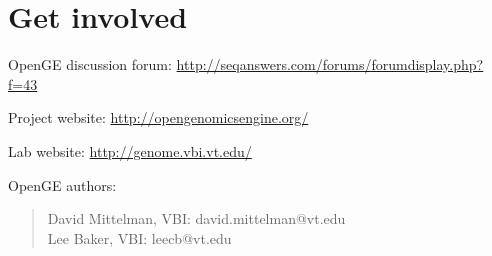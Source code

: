 \documentclass[11pt]{article}
\newcommand {\cmd}[1] {\begin{quote}#1\end{quote}}
\begin{document}
\section {Get involved}

OpenGE discussion forum: \url{http://seqanswers.com/forums/forumdisplay.php?f=43}

Project website: \url{http://opengenomicsengine.org/}

Lab website: \url{http://genome.vbi.vt.edu/}

OpenGE authors:
\cmd{David Mittelman, VBI: david.mittelman@vt.edu\\Lee Baker, VBI: leecb@vt.edu}
\end{document}
